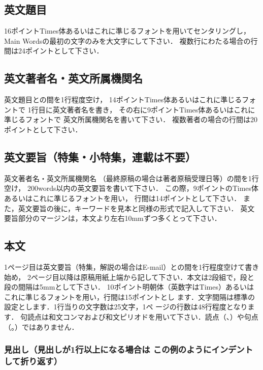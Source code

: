 \documentclass[原著論文]{nagare}
\begin{document}
\subsection{英文題目}

16ポイントTimes体あるいはこれに準じるフォントを用いてセンタリングし，
Main Wordsの最初の文字のみを大文字にして下さい．
複数行にわたる場合の行間は24ポイントとして下さい．

\subsection{英文著者名・英文所属機関名}

英文題目との間を1行程度空け，
14ポイントTimes体あるいはこれに準じるフォントで
1行目に英文著者名を書き，
その右に9ポイントTimes体あるいはこれに準じるフォントで
英文所属機関名を書いて下さい．
複数著者の場合の行間は20ポイントとして下さい．

\subsection{英文要旨（特集・小特集，連載は不要）}

英文著者名・英文所属機関名
（最終原稿の場合は著者原稿受理日等）の間を1行空け，
200words以内の英文要旨を書いて下さい．
この際，9ポイントのTimes体あるいはこれに準じるフォントを用い，
行間は14ポイントとして下さい．
また，英文要旨の後に，キーワードを見本と同様の形式で記入して下さい．
英文要旨部分のマージンは，本文より左右10mmずつ多くとって下さい．

\subsection{本文}

1ページ目は英文要旨（特集，解説の場合はE-mail）との間を1行程度空けて書き始め，
2ページ目以降は原稿用紙上端から記して下さい．本文は2段組で，段と段の間隔は5mmとして下さい．
10ポイント明朝体（英数字はTimes）あるいはこれに準じるフォントを用い，行間は15ポイントとし
ます．文字間隔は標準の設定とします．1行当りの文字数は25文字，1ペ
ージの行数は48行程度となります．
句読点は和文コンマおよび和文ピリオドを用いて下さい．読点（、）や句点（。）ではありません．

\subsubsection{見出し（見出しが1行以上になる場合は%
この例のようにインデントして折り返す）}
\end{document}

